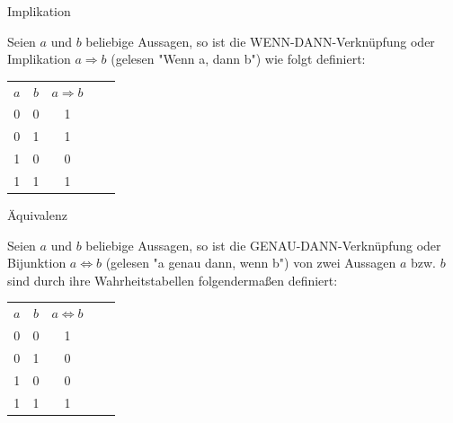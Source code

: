 \documentclass[12pt%
,aspectratio=169%
]{beamer}
\begin{document}
\begin{frame}{Implikation}
\begin{definition}[Aussagenlogik]
Seien $a$ und $b$ beliebige Aussagen, so ist die WENN-DANN-Verknüpfung oder Implikation $a \Rightarrow b$ (gelesen "Wenn a, dann b") wie folgt definiert:
\begin{center}
\begin{table}[]
\begin{tabular}{|c|c|c|ll}
\cline{1-3}
$a$ & $b$ & $a \Rightarrow b$ &  &  \\ \cline{1-3}
0 & 0 & 1 &  &  \\ \cline{1-3}
0 & 1 & 1 &  &  \\ \cline{1-3}
1 & 0 & 0 &  &  \\ \cline{1-3}
1 & 1 & 1 &  &  \\ \cline{1-3}
\end{tabular}
\end{table}
\end{center}
\end{definition}
\end{frame}


\begin{frame}{Äquivalenz}
\begin{definition}[Äquivalenz]
Seien $a$ und $b$ beliebige Aussagen, so ist die GENAU-DANN-Verknüpfung oder Bijunktion $a \Leftrightarrow b$ (gelesen "a genau dann, wenn b") von zwei Aussagen $a$ bzw. $b$ sind durch ihre Wahrheitstabellen folgendermaßen definiert:
\begin{center}
\begin{table}[]
\begin{tabular}{|c|c|c|ll}
\cline{1-3}
$a$ & $b$ & $a \Leftrightarrow b$ &  &  \\ \cline{1-3}
0 & 0 & 1 &  &  \\ \cline{1-3}
0 & 1 & 0 &  &  \\ \cline{1-3}
1 & 0 & 0 &  &  \\ \cline{1-3}
1 & 1 & 1 &  &  \\ \cline{1-3}
\end{tabular}
\end{table}
\end{center}
\end{definition}
\end{frame}
\end{document}
